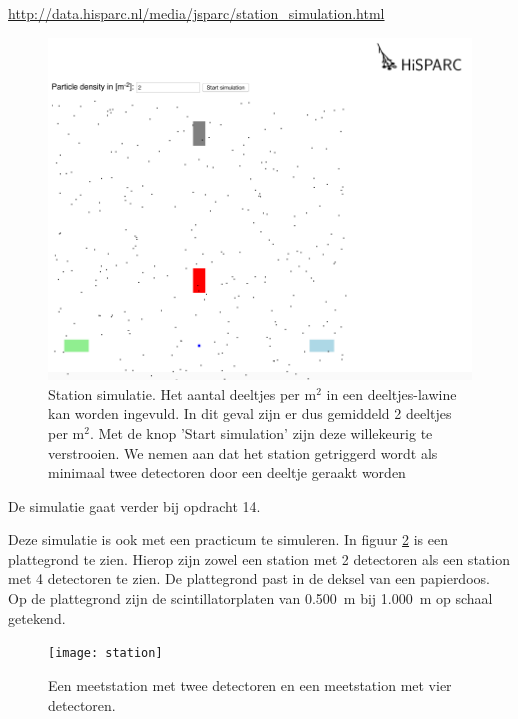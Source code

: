 \url{http://data.hisparc.nl/media/jsparc/station_simulation.html}

\begin{figure}[H]
\includegraphics[width=15cm]{./Figures/Station_simulation}

\caption{\label{fig:Station_simulatie}Station simulatie. Het aantal deeltjes
per m$^{2}$ in een deeltjes-lawine kan worden ingevuld. In dit geval zijn er
dus gemiddeld 2 deeltjes per m$^{2}$. Met de knop 'Start simulation' zijn deze
willekeurig te verstrooien. We nemen aan dat het station getriggerd wordt als
minimaal twee detectoren door een deeltje geraakt worden}

\end{figure}


De simulatie gaat verder bij opdracht 14.

Deze simulatie is ook met een practicum te simuleren. In
figuur \ref{fig:Meetstations} is een plattegrond te zien. Hierop
zijn zowel een station met 2 detectoren als een station met 4 detectoren
te zien. De plattegrond past in de deksel van een papierdoos. Op de
plattegrond zijn de scintillatorplaten van \SI{0.500}{\meter} bij
\SI{1.000}{\meter} op schaal getekend.

\begin{figure}[h]
    \centering
    \texttt{[image: station]}
    \caption{Een meetstation met twee detectoren en een
    meetstation met vier detectoren.}
    \label{fig:Meetstations}
\end{figure}

